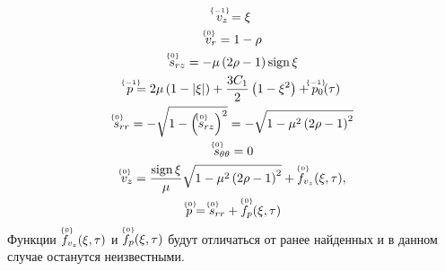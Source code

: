\begin{subequations}
  \label{sol:ch2/sec6/sub2/main/int}
  \begin{gather}
    \label{sol:ch2/sec6/sub2/vz/-1}
    \uindex{v}{-1}_{z} = \xi
    \\
    \label{sol:ch2/sec6/sub2/vr/0}
    \uindex{v}{0}_{r} =  1 - \rho
    \\
    \label{sol:ch2/sec6/sub2/srz/0}
    \uindex{s}{0}_{rz} = -\mu \left(2\rho - 1\right) \sign \xi
    \\
    \label{sol:ch2/sec6/sub2/p/-1}
    \uindex{p}{-1} = 2\mu\left(1-\lvert\xi\rvert\right) + \frac{3 C_1}{2}\left(1-\xi^2\right) + \uindex{p}{-1}_{0}(\tau)
    \\
    \label{sol:ch2/sec6/sub2/srr/0}
    \uindex{s}{0}_{rr} = -\sqrt{1-\left(\uindex{s}{0}_{rz}\right)^2} = -\sqrt{1-\mu^2\left(2\rho-1\right)^2}
    \\
    \label{sol:ch2/sec6/sub2/stt/0}
    \uindex{s}{0}_{\theta\theta} = 0
    \\
    \label{sol:ch2/sec6/sub2/vz/0}
    \uindex{v}{0}_{z} = \frac{\sign\xi}{\mu}\sqrt{1-\mu^2\left(2\rho-1\right)^2} + \uindex{f}{0}_{v_{z}}(\xi,\tau),
    \\
    \label{sol:ch2/sec6/sub2/p/0}
    \uindex{p}{0} = \uindex{s}{0}_{rr} +\uindex{f}{0}_{p}(\xi,\tau)
  \end{gather}
\end{subequations}
\endgroup
Функции $\uindex{f}{0}_{v_{z}}(\xi,\tau)$ и $\uindex{f}{0}_{p}(\xi,\tau)$ будут отличаться от ранее найденных и в данном случае останутся неизвестными.

